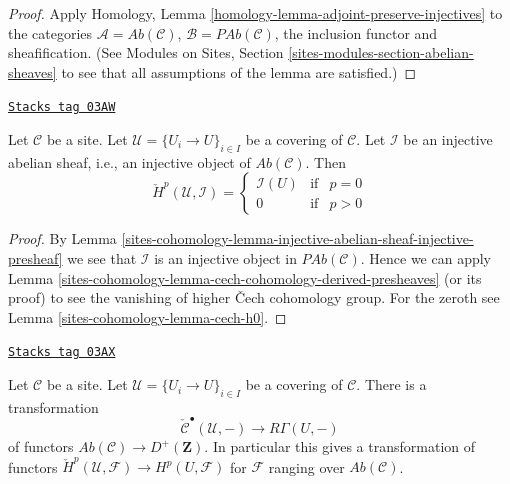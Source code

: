 \begin{proof}
Apply Homology, Lemma \ref{homology-lemma-adjoint-preserve-injectives}
to the categories $\mathcal{A} = \textit{Ab}(\mathcal{C})$,
$\mathcal{B} = \textit{PAb}(\mathcal{C})$, the inclusion functor
and sheafification. (See
Modules on Sites, Section \ref{sites-modules-section-abelian-sheaves} to see
that all assumptions of the lemma are satisfied.)
\end{proof}

\begin{lemma}
\label{sites-cohomology-lemma-injective-trivial-cech}
\href{https://stacks.math.columbia.edu/tag/03AW}{\texttt{Stacks tag 03AW}}

Let $\mathcal{C}$ be a site.
Let $\mathcal{U} = \{U_i \to U\}_{i \in I}$ be a covering of $\mathcal{C}$.
Let $\mathcal{I}$ be an injective abelian sheaf, i.e., an injective
object of $\textit{Ab}(\mathcal{C})$.
Then
$$
\check{H}^p(\mathcal{U}, \mathcal{I}) =
\left\{
\begin{matrix}
\mathcal{I}(U) & \text{if} & p = 0 \\
0 & \text{if} & p > 0
\end{matrix}
\right.
$$
\end{lemma}

\begin{proof}
By Lemma \ref{sites-cohomology-lemma-injective-abelian-sheaf-injective-presheaf}
we see that $\mathcal{I}$ is an injective object in
$\textit{PAb}(\mathcal{C})$.
Hence we can apply Lemma \ref{sites-cohomology-lemma-cech-cohomology-derived-presheaves}
(or its proof) to see the vanishing of higher {\v C}ech cohomology group.
For the zeroth see Lemma \ref{sites-cohomology-lemma-cech-h0}.
\end{proof}

\begin{lemma}
\label{sites-cohomology-lemma-cech-cohomology}
\href{https://stacks.math.columbia.edu/tag/03AX}{\texttt{Stacks tag 03AX}}

Let $\mathcal{C}$ be a site.
Let $\mathcal{U} = \{U_i \to U\}_{i \in I}$ be a covering of $\mathcal{C}$.
There is a transformation
$$
\check{\mathcal{C}}^\bullet(\mathcal{U}, -)
\longrightarrow
R\Gamma(U, -)
$$
of functors
$\textit{Ab}(\mathcal{C}) \to D^{+}(\mathbf{Z})$.
In particular this gives a transformation of functors
$\check{H}^p(\mathcal{U}, \mathcal{F}) \to H^p(U, \mathcal{F})$ for
$\mathcal{F}$ ranging over $\textit{Ab}(\mathcal{C})$.
\end{lemma}


